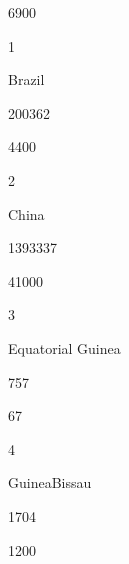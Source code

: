 \documentclass[letterpaper,10pt,english]{sphinxmanual}
\begin{document}
6900









1





Brazil





200362





4400









2





China





1393337





41000









3





Equatorial Guinea





757





67









4





Guinea\sphinxhyphen{}Bissau





1704





1200
\end{document}
